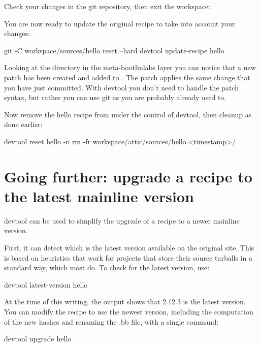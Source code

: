 Check your changes in the git repository, then exit the workspace:


You are now ready to update the original recipe to take into account your
changes:

\begin{bashinput}
git -C workspace/sources/hello reset --hard
devtool update-recipe hello
\end{bashinput}

Looking at the  directory in the meta-bootlinlabs
layer you can notice that a new patch has been created and added to
. The patch applies the same change that you have just
committed. With devtool you don't need to handle the patch syntax, but
rather you can use git as you are probably already used to.

Now remove the hello recipe from under the control of devtool, then cleanup
as done earlier:

\begin{bashinput}
devtool reset hello -n
rm -fr workspace/attic/sources/hello.<timestamp>/
\end{bashinput}

\section{Going further: upgrade a recipe to the latest mainline version}

devtool can be used to simplify the upgrade of a recipe to a newer mainline
version.

First, it can detect which is the latest version available on the original
site. This is based on heuristics that work for projects that store their
source tarballs in a standard way, which most do. To check for the latest
version, use:
\begin{bashinput}
devtool latest-version hello
\end{bashinput}

At the time of this writing, the output shows that 2.12.3 is the latest
version. You can modify the recipe to use the newest version, including the
computation of the new hashes and renaming the .bb file, with a single
command:
\begin{bashinput}
devtool upgrade hello
\end{bashinput}

